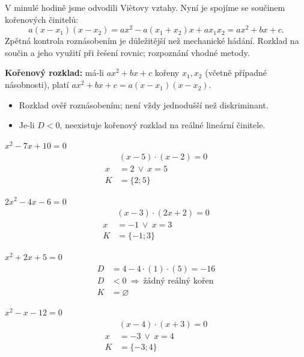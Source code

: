 \documentclass[11pt,a4paper]{article}
\begin{document}
V minulé hodině jsme odvodili Viètovy vztahy. Nyní je spojíme se součinem kořenových činitelů:
\[a(x-x_1)(x-x_2)=ax^2-a(x_1+x_2)x+ax_1x_2=ax^2+bx+c.\]
Zpětná kontrola roznásobením je důležitější než mechanické hádání. 
Rozklad na součin a jeho využití při řešení rovnic; rozpoznání vhodné metody.
\begin{definiceBox}[title={Věta - Kořenový rozklad kvadratického trojčlenu}]
\textbf{Kořenový rozklad:} má-li $ax^2+bx+c$ kořeny $x_1,x_2$ (včetně případné násobnosti), platí $ax^2+bx+c=a(x-x_1)(x-x_2)$.
\end{definiceBox}
\begin{itemize}
\item Rozklad ověř roznásobením; není vždy jednodušší než diskriminant.
\item Je-li $D<0$, neexistuje kořenový rozklad na reálné lineární činitele.
\end{itemize}
\begin{prikladReseniBox}[title={Příklad 1}]
$x^{2} - 7x + 10=0$
\tcblower
\[
\begin{aligned}
&\left(x - 5\right) \cdot \left(x - 2\right)=0\\[2pt]
x&=2\ \vee\ x=5\\[2pt]
K&=\{2;5\}
\end{aligned}
\]
\end{prikladReseniBox}
\begin{prikladReseniBox}[title={Příklad 2}]
$2x^{2} - 4x - 6=0$
\tcblower
\[
\begin{aligned}
&\left(x - 3\right) \cdot \left(2x + 2\right)=0\\[2pt]
x&=-1\ \vee\ x=3\\[2pt]
K&=\{-1;3\}
\end{aligned}
\]
\end{prikladReseniBox}
\begin{prikladReseniBox}[title={Příklad 3}]
$x^{2} + 2x + 5=0$
\tcblower
\[
\begin{aligned}
D&=4-4\cdot(1)\cdot(5)=-16\\[2pt]
D&<0\ \Rightarrow\ \text{žádný reálný kořen}\\[2pt]
K&=\varnothing
\end{aligned}
\]
\end{prikladReseniBox}
\begin{zadaniReseniBox}[title={Samostatná práce 1}]
$x^{2} - x - 12=0$
\tcblower
\[
\begin{aligned}
&\left(x - 4\right) \cdot \left(x + 3\right)=0\\[2pt]
x&=-3\ \vee\ x=4\\[2pt]
K&=\{-3;4\}
\end{aligned}
\]
\end{zadaniReseniBox}
\end{document}
